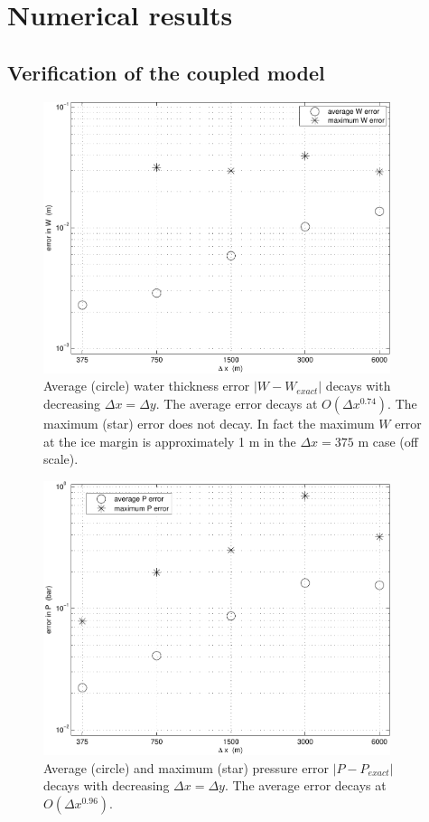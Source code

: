 \documentclass[11pt,final]{amsart}%
\begin{document}
\section{Numerical results}  \label{sec:results}

\subsection*{Verification of the coupled model}

\begin{figure}[ht]
\includegraphics[width=4.0in,keepaspectratio=true]{figs/refineW}
\caption{Average (circle) water thickness error $|W-W_{exact}|$ decays with decreasing $\Delta x = \Delta y$.  The average error decays at $O(\Delta x^{0.74})$.  The maximum (star) error does not decay.  In fact the maximum $W$ error at the ice margin is approximately 1 m in the $\Delta x=375$ m case (off scale).}
\label{fig:refineW}
\end{figure}

\begin{figure}[ht]
\includegraphics[width=4.0in,keepaspectratio=true]{figs/refineP}
\caption{Average (circle) and maximum (star) pressure error $|P-P_{exact}|$ decays with decreasing $\Delta x = \Delta y$.  The average error decays at $O(\Delta x^{0.96})$.}
\label{fig:refineP}
\end{figure}
\end{document}
